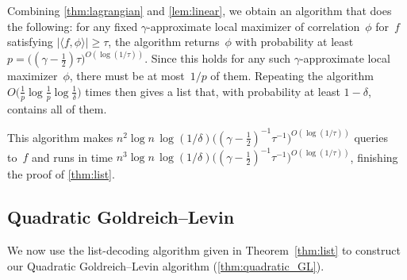 \documentclass[11pt]{amsart}
\theoremstyle{plain}
\theoremstyle{definition}
\theoremstyle{remark}
\begin{document}
Combining \cref{thm:lagrangian} and \cref{lem:linear}, we obtain an algorithm that does the following:
for any fixed $\gamma$-approximate local maximizer of correlation~$\phi$ for~$f$ satisfying $|\langle f, \phi\rangle| \geq \tau$, the algorithm returns~$\phi$ with probability at least $p = \big((\gamma - \tfrac{1}{2}) \tau\big)^{O(\log(1/\tau))}$.
Since this holds for any such $\gamma$-approximate local maximizer~$\phi$, there must be at most~$1/p$ of them.
Repeating the algorithm $O\big(\tfrac{1}{p} \log\tfrac{1}{p} \log\tfrac{1}{\delta}\big)$ times then gives a list that, with probability at least $1-\delta$, contains all of them.

This algorithm makes $n^2 \log n\, \log(1/\delta) \big((\gamma - \tfrac{1}{2})^{-1} \tau^{-1}\big)^{O(\log(1/\tau))}$ queries to~$f$ and runs in time $n^3 \log n\, \log(1/\delta) \big((\gamma - \tfrac{1}{2})^{-1} \tau^{-1}\big)^{O(\log(1/\tau))}$, finishing the proof of \cref{thm:list}.


\subsection{Quadratic Goldreich--Levin}
We now use the list-decoding algorithm given in Theorem~\ref{thm:list} to construct our Quadratic Goldreich--Levin algorithm (\cref{thm:quadratic_GL}).
\end{document}
